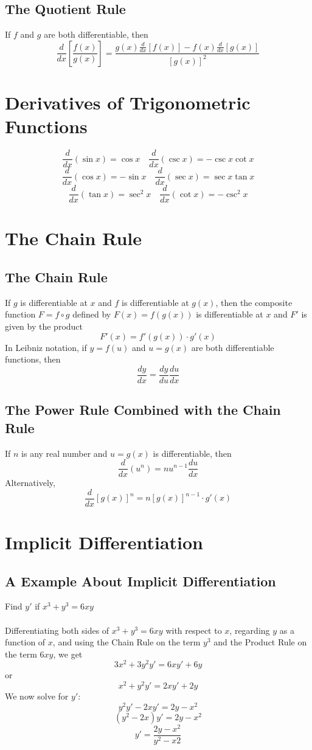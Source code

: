 \documentclass[10pt,a4paper,oneside]{article}
\begin{document}
\subsection{The Quotient Rule}
If $f$ and $g$ are both differentiable, then
\[
\frac{d}{dx}[\frac{f(x)}{g(x)}]=\frac{g(x)\frac{d}{dx}[f(x)]-f(x)\frac{d}{dx}[g(x)]}{[g(x)]^2}
\]
\section{Derivatives of Trigonometric Functions}
\[
\frac{d}{dx}(\sin x)=\cos x\quad\frac{d}{dx}(\csc x)=-\csc x\cot x
\]
\[
\frac{d}{dx}(\cos x)=-\sin x\quad\frac{d}{dx}(\sec x)=\sec x\tan x
\]
\[
\frac{d}{dx}(\tan x)= \sec^2x\quad\frac{d}{dx}(\cot x)=-\csc^2x
\]
\section{The Chain Rule}
\subsection{The Chain Rule}
If $g$ is differentiable at $x$ and $f$ is differentiable at $g(x)$, then the composite function $F=f\circ g$ defined by $F(x)=f(g(x))$ is differentiable at $x$ and $F'$ is given by the product
\[
F'(x)=f'(g(x))\cdot g'(x)
\]
In Leibniz notation, if $y=f(u)$ and $u=g(x)$ are both differentiable functions, then
\[
\frac{dy}{dx}=\frac{dy}{du}\frac{du}{dx}
\]
\subsection{The Power Rule Combined with the Chain Rule}
If $n$ is any real number and $u=g(x)$ is differentiable, then
\[
\frac{d}{dx}(u^n)=nu^{n-1}\frac{du}{dx}
\]
Alternatively,
\[
\frac{d}{dx}[g(x)]^n=n[g(x)]^{n-1}\cdot g'(x)
\]
\section{Implicit Differentiation}
\subsection{A Example About Implicit Differentiation}
Find $y'$ if $x^3+y^3=6xy$\\
\\
Differentiating both sides of $x^3+y^3=6xy$ with respect to $x$, regarding $y$ as a function of $x$, and using the Chain Rule on the term $y^3$ and the Product Rule on the term $6xy$, we get
\[
3x^2+3y^2y'=6xy'+6y
\]
or
\[
x^2+y^2y'=2xy'+2y
\]
We now solve for $y'$:
\[
y^2y'-2xy'=2y-x^2
\]
\[
(y^2-2x)y'=2y-x^2
\]
\[
y'=\frac{2y-x^2}{y^2-x2}
\]
\end{document}
